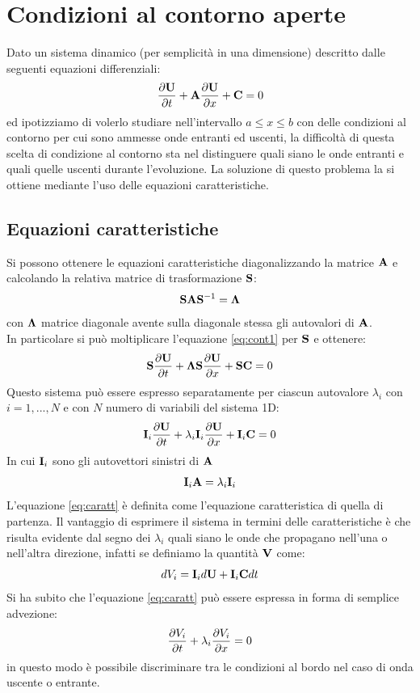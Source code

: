 \appendix
\section{Condizioni al contorno aperte}
\label{appendix:nonrefl}
Dato un sistema dinamico (per semplicità in una dimensione) descritto dalle seguenti equazioni differenziali:
\begin{equation}
    \pd{\vv{U}} + \vv{A} \pdx{\vv{U}}{x} + \vv{C}= 0
    \label{eq:cont1}
\end{equation}
ed ipotizziamo di volerlo studiare nell'intervallo $a\le x \le b$ con delle condizioni al contorno per cui sono ammesse onde entranti ed uscenti, la difficoltà di questa scelta di condizione al contorno sta nel distinguere quali siano le onde entranti e quali quelle uscenti durante l'evoluzione. La soluzione di questo problema la si ottiene mediante l'uso delle equazioni caratteristiche.
\subsection{Equazioni caratteristiche}
Si possono ottenere le equazioni caratteristiche diagonalizzando la matrice $\vv{A}$ e calcolando la relativa matrice di trasformazione $\vv{S}$:
\[
    \vv{S} \vv{A} \vv{S}^{-1} = \vv{\Lambda}
\]
con $\vv{\Lambda}$ matrice diagonale avente sulla diagonale stessa gli autovalori di $\vv{A}$. \\
In particolare si può moltiplicare l'equazione \ref{eq:cont1} per $\vv{S}$ e ottenere: 
\[
    \vv{S} \pd{\vv{U}} + \vv{\Lambda} \vv{S} \pdx{\vv{U}}{x} + \vv{S}\vv{C}= 0
\]
Questo sistema può essere espresso separatamente per ciascun autovalore $\lambda_i$ con $i = 1, ..., N$ e con $N$ numero di variabili del sistema 1D:
\begin{equation}
    \vv{I}_i \pd{\vv{U}} + \vv{\lambda}_i \vv{I}_i \pdx{\vv{U}}{x} + \vv{I}_i \vv{C} = 0 \label{eq:caratt}
\end{equation}
In cui $\vv{I}_i$ sono gli autovettori sinistri di $\vv{A}$
\[\vv{I}_i \vv{A} = \lambda_i \vv{I}_i\]
L'equazione \ref{eq:caratt} è definita come l'equazione caratteristica di quella di partenza. Il vantaggio di esprimere il sistema in termini delle caratteristiche è che risulta evidente dal segno dei $\lambda_i$ quali siano le onde che propagano nell'una o nell'altra direzione, infatti se definiamo la quantità $\vv{V}$ come:
\[
    dV_i = \vv{I}_id\vv{U} + \vv{I}_i \vv{C}dt
\]
Si ha subito che l'equazione \ref{eq:caratt} può essere espressa in forma di semplice advezione:
\[
    \frac{\partial V_i}{\partial t} + \lambda_i \frac{\partial V_i}{\partial x} = 0
\]
in questo modo è possibile discriminare tra le condizioni al bordo nel caso di onda uscente o entrante. \\
